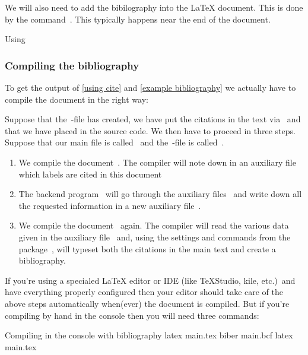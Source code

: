 \begin{refsection}
We will also need to add the bibilography into the {\LaTeX} document.
This is done by the command~.
This typically happens near the end of the document.
\let\oldprintbibliography\printbibliography
\renewcommand{\printbibliography}{\oldprintbibliography[heading=subbibliography,title={Bibliography}]}
\begin{showlatex}[label = {example bibliography}]
  {Using }
\printbibliography
\end{showlatex}
\let\printbibliography\oldprintbibliography



\subsubsection{Compiling the bibliography}

To get the output of \cref{using cite} and \cref{example bibliography} we actually have to compile the document in the right way:

Suppose that the~-file has created, we have put the citations in the text via~ and that we have placed  in the source code.
We then have to proceed in three steps.
Suppose that our main file is called~ and the~-file is called~.
\begin{enumerate}
  \item
    We compile the document~.
    The compiler will note down in an auxiliary file~ which labels are cited in this document
  \item
    The backend program~ will go through the auxiliary files~ and write down all the requested information in a new auxiliary file~.
  \item
    We compile the document~ again.
    The compiler will read the various data given in the auxiliary file~ and, using the settings and commands from the package~, will typeset both the citations in the main text and create a bibliography.
\end{enumerate}
\end{refsection}
If you’re using a specialed {\LaTeX} editor or IDE (like {\TeX}Studio, kile, etc.)\ and have everything properly configured then your editor should take care of the above steps automatically when(ever) the document is compiled.
But if you’re compiling by hand in the console then you will need three commands:
\begin{showcode}{Compiling in the console with bibliography}
latex main.tex
biber main.bcf
latex main.tex
\end{showcode}





